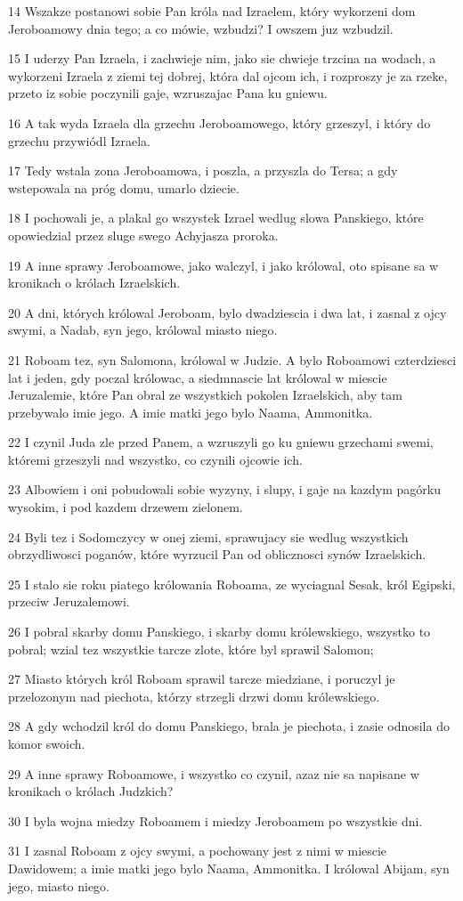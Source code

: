 \par 14 Wszakze postanowi sobie Pan króla nad Izraelem, który wykorzeni dom Jeroboamowy dnia tego; a co mówie, wzbudzi? I owszem juz wzbudzil.
\par 15 I uderzy Pan Izraela, i zachwieje nim, jako sie chwieje trzcina na wodach, a wykorzeni Izraela z ziemi tej dobrej, która dal ojcom ich, i rozproszy je za rzeke, przeto iz sobie poczynili gaje, wzruszajac Pana ku gniewu.
\par 16 A tak wyda Izraela dla grzechu Jeroboamowego, który grzeszyl, i który do grzechu przywiódl Izraela.
\par 17 Tedy wstala zona Jeroboamowa, i poszla, a przyszla do Tersa; a gdy wstepowala na próg domu, umarlo dziecie.
\par 18 I pochowali je, a plakal go wszystek Izrael wedlug slowa Panskiego, które opowiedzial przez sluge swego Achyjasza proroka.
\par 19 A inne sprawy Jeroboamowe, jako walczyl, i jako królowal, oto spisane sa w kronikach o królach Izraelskich.
\par 20 A dni, których królowal Jeroboam, bylo dwadziescia i dwa lat, i zasnal z ojcy swymi, a Nadab, syn jego, królowal miasto niego.
\par 21 Roboam tez, syn Salomona, królowal w Judzie. A bylo Roboamowi czterdziesci lat i jeden, gdy poczal królowac, a siedmnascie lat królowal w miescie Jeruzalemie, które Pan obral ze wszystkich pokolen Izraelskich, aby tam przebywalo imie jego. A imie matki jego bylo Naama, Ammonitka.
\par 22 I czynil Juda zle przed Panem, a wzruszyli go ku gniewu grzechami swemi, któremi grzeszyli nad wszystko, co czynili ojcowie ich.
\par 23 Albowiem i oni pobudowali sobie wyzyny, i slupy, i gaje na kazdym pagórku wysokim, i pod kazdem drzewem zielonem.
\par 24 Byli tez i Sodomczycy w onej ziemi, sprawujacy sie wedlug wszystkich obrzydliwosci poganów, które wyrzucil Pan od oblicznosci synów Izraelskich.
\par 25 I stalo sie roku piatego królowania Roboama, ze wyciagnal Sesak, król Egipski, przeciw Jeruzalemowi.
\par 26 I pobral skarby domu Panskiego, i skarby domu królewskiego, wszystko to pobral; wzial tez wszystkie tarcze zlote, które byl sprawil Salomon;
\par 27 Miasto których król Roboam sprawil tarcze miedziane, i poruczyl je przelozonym nad piechota, którzy strzegli drzwi domu królewskiego.
\par 28 A gdy wchodzil król do domu Panskiego, brala je piechota, i zasie odnosila do komor swoich.
\par 29 A inne sprawy Roboamowe, i wszystko co czynil, azaz nie sa napisane w kronikach o królach Judzkich?
\par 30 I byla wojna miedzy Roboamem i miedzy Jeroboamem po wszystkie dni.
\par 31 I zasnal Roboam z ojcy swymi, a pochowany jest z nimi w miescie Dawidowem; a imie matki jego bylo Naama, Ammonitka. I królowal Abijam, syn jego, miasto niego.

